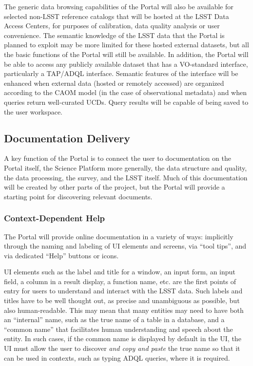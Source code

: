 The generic data browsing capabilities of the Portal will also be available for selected non-LSST reference catalogs that will be hosted at the LSST Data Access Centers, for purposes of calibration, data quality analysis or user convenience.
The semantic knowledge of the LSST data that the Portal is planned to exploit may be more limited for these hosted external datasets, but all the basic functions of the Portal will still be available.
In addition, the Portal will be able to access any publicly available dataset that has a VO-standard interface, particularly a TAP/ADQL interface.
Semantic features of the interface will be enhanced when external data (hosted or remotely accessed) are organized according to the CAOM model (in the case of observational metadata) and when queries return well-curated UCDs.
Query results will be capable of being saved to the user workspace.

\subsection{Documentation Delivery}\label{documentation-delivery}

A key function of the Portal is to connect the user to documentation on the Portal itself, the Science Platform more generally, the data structure and quality, the data processing, the survey, and the LSST itself.
Much of this documentation will be created by other parts of the project, but the Portal will provide a starting point for discovering relevant documents.

\subsubsection{Context-Dependent Help}\label{context-dependent-help}

The Portal will provide online documentation in a variety of ways: implicitly through the naming and labeling of UI elements and screens, via ``tool tips'', and via dedicated ``Help'' buttons or icons.

UI elements such as the label and title for a window, an input form, an input field, a column in a result display, a function name, etc. are the first points of entry for users to understand and interact with the LSST data.
Such labels and titles have to be well thought out, as precise and unambiguous as possible, but also human-readable.
This may mean that many entities may need to have both an ``internal'' name, such as the true name of a table in a database, and a ``common name'' that facilitates human understanding and speech about the entity.
In such cases, if the common name is displayed by default in the UI, the UI must allow the user to discover \emph{and copy and paste} the true name so that it can be used in contexts, such as typing ADQL queries, where it is required.

